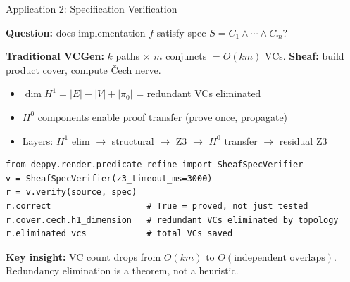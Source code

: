 \documentclass[aspectratio=169,10pt]{beamer}
\newcommand{\keyinsight}[1]{%
  \vspace{2pt}
  \begin{center}
  \colorbox{sheafbox}{\parbox{0.88\textwidth}{\centering\small\textbf{\textcolor{keyblue}{Key insight:}} #1}}
  \end{center}
  \vspace{-4pt}
}
\begin{document}
\begin{frame}[fragile]{Application 2: Specification Verification}

\textbf{Question:} does implementation $f$ satisfy spec $S = C_1 \wedge \cdots \wedge C_m$?

\vspace{0.15em}
{\small
\textbf{Traditional VCGen:} $k$ paths $\times$ $m$ conjuncts $= O(km)$ VCs.\quad
\textbf{Sheaf:} build product cover, compute \v{C}ech nerve.

\vspace{0.1em}
\begin{itemize}
  \item $\dim H^1 = |E| - |V| + |\pi_0|$ = redundant VCs eliminated
  \item $H^0$ components enable proof transfer (prove once, propagate)
  \item Layers: $H^1$ elim $\to$ structural $\to$ Z3 $\to$ $H^0$ transfer $\to$ residual Z3
\end{itemize}
}

\begin{lstlisting}
from deppy.render.predicate_refine import SheafSpecVerifier
v = SheafSpecVerifier(z3_timeout_ms=3000)
r = v.verify(source, spec)
r.correct                   # True = proved, not just tested
r.cover.cech.h1_dimension   # redundant VCs eliminated by topology
r.eliminated_vcs            # total VCs saved
\end{lstlisting}

\keyinsight{VC count drops from $O(km)$ to $O(\text{independent overlaps})$.
Redundancy elimination is a theorem, not a heuristic.}
\end{frame}
\end{document}
